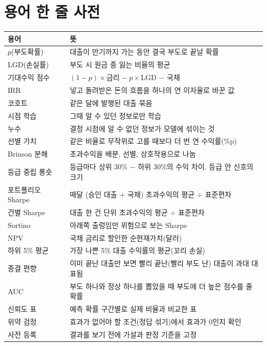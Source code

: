 \chapter{용어 한 줄 사전}
{\small
\begin{longtable}{@{}p{40mm}p{110mm}@{}}\toprule
용어 & 뜻\\\midrule\endhead
$p$(부도확률) & 대출이 만기까지 가는 동안 결국 부도로 끝날 확률\\
LGD(손실률) & 부도 시 원금 중 잃는 비율의 평균\\
기대수익 점수 & $(1-p)\times$금리 $-\ p\times$LGD $-$ 국채\\
IRR & 넣고 돌려받은 돈의 흐름을 하나의 연 이자율로 바꾼 값\\
코호트 & 같은 달에 발행된 대출 묶음\\
시점 학습 & 그때 알 수 있던 정보로만 학습\\
누수 & 결정 시점에 알 수 없던 정보가 모델에 섞이는 것\\
선별 가치 & 같은 비율로 무작위로 고를 때보다 더 번 연 수익률(\%p)\\
Brinson 분해 & 초과수익을 배분, 선별, 상호작용으로 나눔\\
등급 중립 롱숏 & 등급마다 상위 30\% $-$ 하위 30\%의 수익 차이. 등급 안 신호의 크기\\
포트폴리오 Sharpe & 매달 (승인 대출 + 국채) 초과수익의 평균 \ensuremath{\div} 표준편차\\
건별 Sharpe & 대출 한 건 단위 초과수익의 평균 \ensuremath{\div} 표준편차\\
Sortino & 아래쪽 출렁임만 위험으로 보는 Sharpe\\
NPV & 국채 금리로 할인한 순현재가치(달러)\\
하위 5\% 평균 & 가장 나쁜 5\% 대출 수익률의 평균(꼬리 손실)\\
종결 편향 & 이미 끝난 대출만 보면 빨리 끝난(빨리 부도 난) 대출이 과대 대표됨\\
AUC & 부도 하나와 정상 하나를 뽑았을 때 부도에 더 높은 점수를 줄 확률\\
신뢰도 표 & 예측 확률 구간별로 실제 비율과 비교한 표\\
위약 검정 & 효과가 없어야 할 조건(정답 섞기)에서 효과가 0인지 확인\\
사전 등록 & 결과를 보기 전에 가설과 판정 기준을 고정\\\bottomrule
\end{longtable}}
